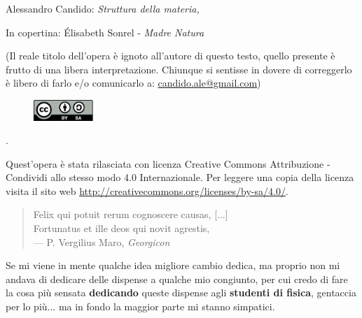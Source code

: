 \thispagestyle{empty}

\hfill

\vfill


\noindent Alessandro Candido: \textit{Struttura della materia,}
\textcopyleft\ \DTMMonthname{\the\month} \the\year
\newline

\noindent In copertina: \'Elisabeth Sonrel - \textit{Madre Natura}

(Il reale titolo dell'opera è ignoto all'autore di questo testo, quello presente è frutto di una libera interpretazione. Chiunque si sentisse in dovere di correggerlo è libero di farlo e/o comunicarlo a: \href{mailto:candido.ale@gmail.com}{candido.ale@gmail.com})

\begin{figure}
	\centering
	\includegraphics[width=0.2\textwidth]{Licenza/by-sa.pdf}
\end{figure}
.
\newline

Quest'opera è stata rilasciata con licenza Creative Commons Attribuzione - Condividi allo stesso modo 4.0 Internazionale. Per leggere una copia della licenza visita il sito web \href{http://creativecommons.org/licenses/by-sa/4.0/}{http://creativecommons.org/licenses/by-sa/4.0/}.

\setcounter{tocdepth}{2}
\tableofcontents
\markboth{\scshape{\contentsname}}{\scshape{\contentsname}}

\clearpage
{}
\thispagestyle{empty}

\vspace*{3cm}

\begin{quote}
	Felix qui potuit rerum cognoscere causas, [...] \\
	Fortunatus et ille deos qui novit agrestis, \\ \medskip
	--- P. Vergilius Maro, \textit{Georgicon}
\end{quote}

\medskip

\begin{center}
	Se mi viene in mente qualche idea migliore cambio dedica, ma proprio non mi andava di dedicare delle dispense a qualche mio congiunto, per cui credo di fare la cosa più sensata \textbf{dedicando} queste dispense agli \textbf{studenti di fisica}, gentaccia per lo più... ma in fondo la maggior parte mi stanno simpatici.
\end{center}

